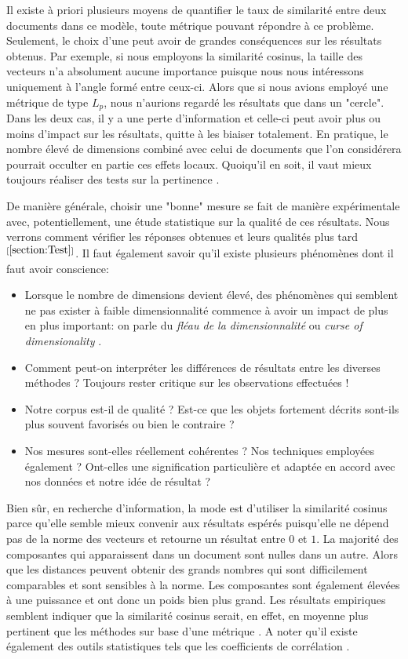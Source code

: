 Il existe à priori plusieurs moyens de quantifier le taux de similarité entre deux documents dans ce modèle, toute métrique pouvant répondre à ce problème. Seulement, le choix d'une peut avoir de grandes conséquences sur les résultats obtenus. Par exemple, si nous employons la similarité cosinus, la taille des vecteurs n'a absolument aucune importance puisque nous nous intéressons uniquement à l'angle formé entre ceux-ci. Alors
 que si nous avions employé une métrique de type $L_p$, nous n'aurions regardé les résultats que dans un "cercle". Dans les deux cas, il y a une perte d'information et celle-ci peut avoir plus ou moins d'impact sur les résultats, quitte à les biaiser totalement. En pratique, le nombre élevé de dimensions combiné avec celui de documents que l'on considérera pourrait occulter en partie ces effets locaux. Quoiqu'il en soit, il vaut mieux toujours réaliser des tests sur la pertinence \cite{hand2001principles}.

De manière générale, choisir une "bonne" mesure se fait de manière expérimentale avec, potentiellement, une étude statistique sur la qualité de ces résultats. Nous verrons comment vérifier les réponses obtenues et leurs qualités plus tard$^{[\ref{section:Test}]}$. Il faut également savoir qu'il existe plusieurs phénomènes dont il faut avoir conscience:
\begin{itemize}
  \item Lorsque le nombre de dimensions devient élevé, des phénomènes qui semblent ne pas exister à faible dimensionnalité commence à avoir un impact de plus en plus important: on parle du \textit{fléau de la dimensionnalité} ou \textit{curse of dimensionality} \cite{bellman1957dynamic}.
  \item Comment peut-on interpréter les différences de résultats entre les diverses méthodes ? Toujours rester critique sur les observations effectuées !
  \item Notre corpus est-il de qualité ? Est-ce que les objets fortement décrits sont-ils plus souvent favorisés ou bien le contraire ?
  \item Nos mesures sont-elles réellement cohérentes ? Nos techniques employées également ? Ont-elles une signification particulière et adaptée en accord avec nos données et notre idée de résultat ?
\end{itemize}

Bien sûr, en recherche d'information, la mode est d'utiliser la similarité cosinus parce qu'elle semble mieux convenir aux résultats espérés puisqu'elle ne dépend pas de la norme des vecteurs et retourne un résultat entre $0$ et $1$. La majorité des composantes qui apparaissent dans un document sont nulles dans un autre. Alors que les distances peuvent obtenir des grands nombres qui sont difficilement comparables et sont sensibles à la norme. Les composantes sont également élevées à une puissance et ont donc un poids bien plus grand. Les résultats empiriques semblent indiquer que la similarité cosinus serait, en effet, en moyenne plus pertinent que les méthodes sur base d'une métrique \cite{qian2004similarity}. A noter qu'il existe également des outils statistiques tels que les coefficients de corrélation \cite{strehl2000impact}.

